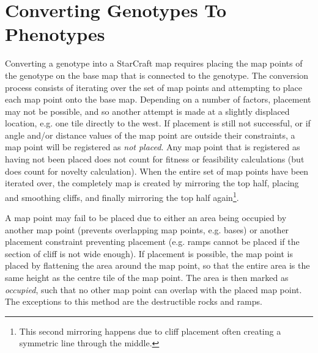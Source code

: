 \section{Converting Genotypes To Phenotypes}
\label{methodology_conversion}
Converting a genotype into a StarCraft map requires placing the map points of the genotype on the base map that is connected to the genotype. The conversion process consists of iterating over the set of map points and attempting to place each map point onto the base map. Depending on a number of factors, placement may not be possible, and so another attempt is made at a slightly displaced location, e.g. one tile directly to the west. If placement is still not successful, or if angle and/or distance values of the map point are outside their constraints, a map point will be registered as \textit{not placed}. Any map point that is registered as having not been placed does not count for fitness or feasibility calculations (but does count for novelty calculation). When the entire set of map points have been iterated over, the completely map is created by mirroring the top half, placing and smoothing cliffs, and finally mirroring the top half again\footnote{This second mirroring happens due to cliff placement often creating a symmetric line through the middle.}. 

A map point may fail to be placed due to either an area being occupied by another map point (prevents overlapping map points, e.g. bases) or another placement constraint preventing placement (e.g. ramps cannot be placed if the section of cliff is not wide enough). If placement is possible, the map point is placed by flattening the area around the map point, so that the entire area is the same height as the centre tile of the map point. The area is then marked as \textit{occupied}, such that no other map point can overlap with the placed map point. The exceptions to this method are the destructible rocks and ramps. 

